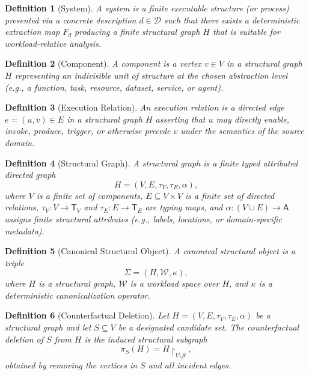 \documentclass[11pt]{article}
\newtheorem{definition}{Definition}
\begin{document}
\begin{definition}[System]
\label{def:system}
A \emph{system} is a finite executable structure (or process) presented via a concrete description $d\in\mathcal{D}$ such that there exists a deterministic extraction map $F_d$ producing a finite structural graph $H$ that is suitable for workload-relative analysis.
\end{definition}

\begin{definition}[Component]
\label{def:component}
A \emph{component} is a vertex $v\in V$ in a structural graph $H$ representing an indivisible unit of structure at the chosen abstraction level (e.g., a function, task, resource, dataset, service, or agent).
\end{definition}

\begin{definition}[Execution Relation]
\label{def:execution-relation}
An \emph{execution relation} is a directed edge $e=(u,v)\in E$ in a structural graph $H$ asserting that $u$ may directly enable, invoke, produce, trigger, or otherwise precede $v$ under the semantics of the source domain.
\end{definition}

\begin{definition}[Structural Graph]
\label{def:structural-graph}
A \emph{structural graph} is a finite typed attributed directed graph
\[
H=(V,E,\tau_V,\tau_E,\alpha),
\]
where $V$ is a finite set of components, $E\subseteq V\times V$ is a finite set of directed relations, $\tau_V:V\to\mathsf{T}_V$ and $\tau_E:E\to\mathsf{T}_E$ are typing maps, and $\alpha:(V\cup E)\to\mathsf{A}$ assigns finite structural attributes (e.g., labels, locations, or domain-specific metadata).
\end{definition}

\begin{definition}[Canonical Structural Object]
\label{def:canonical-structural-object}
A \emph{canonical structural object} is a triple
\[
\Sigma=(H,\mathcal{W},\kappa),
\]
where $H$ is a structural graph, $\mathcal{W}$ is a workload space over $H$, and $\kappa$ is a deterministic canonicalization operator.
\end{definition}

\begin{definition}[Counterfactual Deletion]
\label{def:counterfactual-deletion}
Let $H=(V,E,\tau_V,\tau_E,\alpha)$ be a structural graph and let $S\subseteq V$ be a designated candidate set. The \emph{counterfactual deletion} of $S$ from $H$ is the induced structural subgraph
\[
\pi_S(H)=H\upharpoonright_{V\setminus S},
\]
obtained by removing the vertices in $S$ and all incident edges.
\end{definition}
\end{document}
